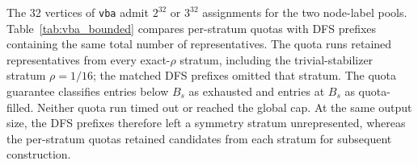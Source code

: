 \documentclass[a5paper, 10pt]{article}
\begin{document}
The 32 vertices of \texttt{vba} admit $2^{32}$ or $3^{32}$ assignments for the two node-label pools. Table~\ref{tab:vba_bounded} compares per-stratum quotas with DFS prefixes containing the same total number of representatives. The quota runs retained representatives from every exact-$\rho$ stratum, including the trivial-stabilizer stratum $\rho=1/16$; the matched DFS prefixes omitted that stratum. The quota guarantee classifies entries below $B_s$ as exhausted and entries at $B_s$ as quota-filled. Neither quota run timed out or reached the global cap. At the same output size, the DFS prefixes therefore left a symmetry stratum unrepresented, whereas the per-stratum quotas retained candidates from each stratum for subsequent construction.
\end{document}

